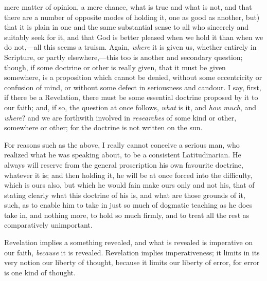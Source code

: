 mere matter of opinion, a mere chance, what is true and what is not,
and that there are a number of opposite modes of holding it, one as
good as another, but) that it is plain in one and the same substantial
sense to all who sincerely and suitably seek for it, and that God is
better pleased when we hold it than when we do not,—all this seems a
truism. Again, \emph{where} it is given us, whether entirely in
Scripture, or partly elsewhere,—this too is another and secondary
question; though, if some doctrine or other is really given, that it
must be given somewhere, is a proposition which cannot be denied,
without some eccentricity or confusion of mind, or without some defect
in seriousness and candour. I say, first, if there be a Revelation,
there must be some essential doctrine proposed by it to our faith;
and, if so, the question at once follows, \emph{what} is it, and \emph{how
much},
and \emph{where}? and we are forthwith involved in \emph{researches} of some kind or
other, somewhere or other; for the doctrine is not written on the sun.

For reasons such as the above, I really cannot conceive a serious
man, who realized what he was speaking about, to be a consistent
Latitudinarian. He always will reserve from the general proscription
his own favourite doctrine, whatever it is; and then holding it, he
will be at once forced into the difficulty, which is ours also, but
which he would fain make ours only and not his, that of stating
clearly what this doctrine of his is, and what are those grounds of
it, such, as to enable him to take in just so much of dogmatic
teaching as he does take in, and nothing more, to hold so much firmly,
and to treat all the rest as comparatively unimportant.

Revelation implies a something revealed, and what is revealed is
imperative on our faith, \emph{because} it is revealed. Revelation
implies imperativeness; it limits in its very notion our liberty of
thought, because it limits our liberty of error, for error is one kind
of thought.

